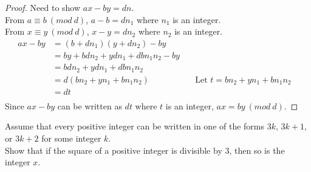 \begin{proof}
Need to show $ax - by = dn$. \\
From $a \equiv b\ (mod\ d)$, $a - b = dn_1$ where $n_1$ is an integer. \\
From $x \equiv y\ (mod\ d)$, $x - y = dn_2$ where $n_2$ is an integer.
\begin{align*}
ax - by &= (b + dn_1)(y + dn_2) - by && \\
&= by + bdn_2 + ydn_1 + dbn_1n_2 - by && \\
&= bdn_2 + ydn_1 + dbn_1n_2 && \\
&= d(bn_2 + yn_1 + bn_1n_2) & \quad \text{Let $t = bn_2 + yn_1 + bn_1n_2$} \\
&= dt && \\
\end{align*}
Since $ax - by$ can be written as $dt$ where $t$ is an integer, $ax = by\ (mod\ d)$.
\end{proof}


\begin{tcolorbox}[title=Problem 26, breakable]
Assume that every positive integer can be written in one of the forms
$3k$, $3k + 1$, or $3k + 2$ for some integer $k$.\\ 
Show that if the square of a positive integer is divisible by $3$,
then so is the integer $x$.
\end{tcolorbox}

